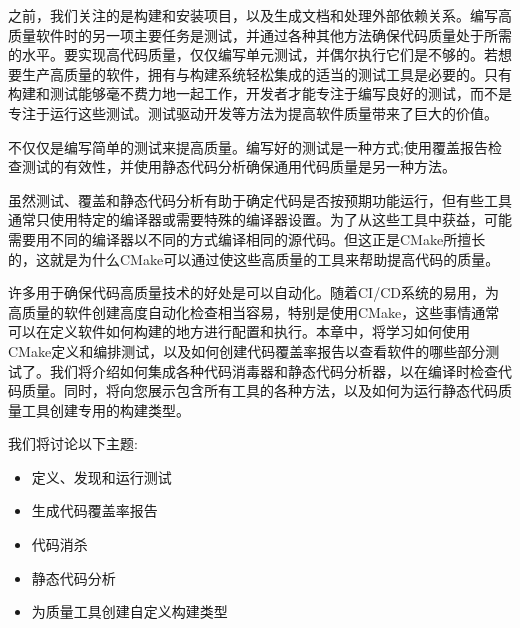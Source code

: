 之前，我们关注的是构建和安装项目，以及生成文档和处理外部依赖关系。编写高质量软件时的另一项主要任务是测试，并通过各种其他方法确保代码质量处于所需的水平。要实现高代码质量，仅仅编写单元测试，并偶尔执行它们是不够的。若想要生产高质量的软件，拥有与构建系统轻松集成的适当的测试工具是必要的。只有构建和测试能够毫不费力地一起工作，开发者才能专注于编写良好的测试，而不是专注于运行这些测试。测试驱动开发等方法为提高软件质量带来了巨大的价值。

不仅仅是编写简单的测试来提高质量。编写好的测试是一种方式;使用覆盖报告检查测试的有效性，并使用静态代码分析确保通用代码质量是另一种方法。

虽然测试、覆盖和静态代码分析有助于确定代码是否按预期功能运行，但有些工具通常只使用特定的编译器或需要特殊的编译器设置。为了从这些工具中获益，可能需要用不同的编译器以不同的方式编译相同的源代码。但这正是CMake所擅长的，这就是为什么CMake可以通过使这些高质量的工具来帮助提高代码的质量。

许多用于确保代码高质量技术的好处是可以自动化。随着CI/CD系统的易用，为高质量的软件创建高度自动化检查相当容易，特别是使用CMake，这些事情通常可以在定义软件如何构建的地方进行配置和执行。本章中，将学习如何使用CMake定义和编排测试，以及如何创建代码覆盖率报告以查看软件的哪些部分测试了。我们将介绍如何集成各种代码消毒器和静态代码分析器，以在编译时检查代码质量。同时，将向您展示包含所有工具的各种方法，以及如何为运行静态代码质量工具创建专用的构建类型。

我们将讨论以下主题:

\begin{itemize}
\item 
定义、发现和运行测试

\item 
生成代码覆盖率报告

\item 
代码消杀

\item 
静态代码分析

\item 
为质量工具创建自定义构建类型
\end{itemize}

















